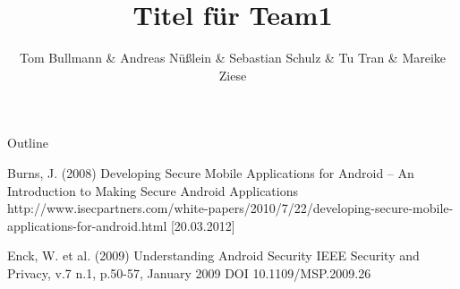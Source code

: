 \documentclass[ucs,10pt]{beamer}
\title{Titel für Team1}
\author{Tom Bullmann \& Andreas Nüßlein \& Sebastian Schulz \& Tu Tran \& Mareike Ziese}
\institute[FU Berlin] %
{Freie Universität Berlin}
\begin{document}
	\begin{frame}[plain]
		\titlepage
	\end{frame}

	\begin{frame}{Outline}
		\tableofcontents
	\end{frame}





\appendix

\begin{thebibliography}{10}

\beamertemplatebookbibitems

\beamertemplatearticlebibitems
\footnotesize
	Burns, J. (2008)
	\newblock Developing Secure Mobile Applications for Android -- An Introduction to Making Secure Android Applications
	\newblock http://www.isecpartners.com/white-papers/2010/7/22/developing-secure-mobile-applications-for-android.html [20.03.2012]

	Enck, W. et al. (2009)
	\newblock Understanding Android Security
	\newblock IEEE Security and Privacy, v.7 n.1, p.50-57, January 2009
	\newblock DOI 10.1109/MSP.2009.26

 \end{thebibliography}
\end{document}
